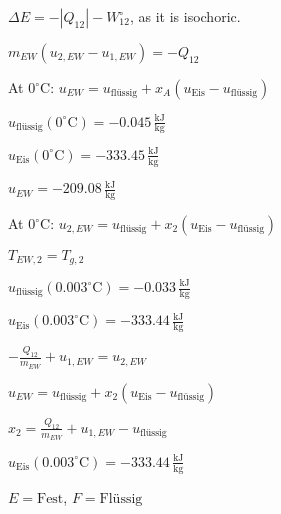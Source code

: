 \( \Delta E = -|Q_{12}| - W_{12}^{\circ} \), as it is isochoric.

\( m_{EW} (u_{2,EW} - u_{1,EW}) = -Q_{12} \)

At \( 0^\circ \text{C} \): \( u_{EW} = u_{\text{flüssig}} + x_{A} (u_{\text{Eis}} - u_{\text{flüssig}}) \)

\( u_{\text{flüssig}} (0^\circ \text{C}) = -0.045 \, \frac{\text{kJ}}{\text{kg}} \)

\( u_{\text{Eis}} (0^\circ \text{C}) = -333.45 \, \frac{\text{kJ}}{\text{kg}} \)

\( u_{EW} = -209.08 \, \frac{\text{kJ}}{\text{kg}} \)

At \( 0^\circ \text{C} \): \( u_{2,EW} = u_{\text{flüssig}} + x_{2} (u_{\text{Eis}} - u_{\text{flüssig}}) \)

\( T_{EW,2} = T_{g,2} \)

\( u_{\text{flüssig}} (0.003^\circ \text{C}) = -0.033 \, \frac{\text{kJ}}{\text{kg}} \)

\( u_{\text{Eis}} (0.003^\circ \text{C}) = -333.44 \, \frac{\text{kJ}}{\text{kg}} \)

\( -\frac{Q_{12}}{m_{EW}} + u_{1,EW} = u_{2,EW} \)

\( u_{EW} = u_{\text{flüssig}} + x_{2} (u_{\text{Eis}} - u_{\text{flüssig}}) \)

\( x_{2} = \frac{Q_{12}}{m_{EW}} + u_{1,EW} - u_{\text{flüssig}} \)

\( u_{\text{Eis}} (0.003^\circ \text{C}) = -333.44 \, \frac{\text{kJ}}{\text{kg}} \)

\( E = \text{Fest} \), \( F = \text{Flüssig} \)